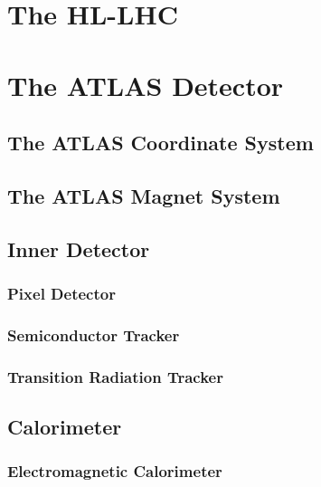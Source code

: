 \documentclass{umassthesis}          %
\begin{document}
\section{The HL-LHC}\label{sec:hl_lhc}


\section{The ATLAS Detector}\label{sec:atlas_detector}


\subsection{The ATLAS Coordinate System}\label{sec:atlas_coordinate_system}


\subsection{The ATLAS Magnet System}\label{sec:atlas_magnet}


\subsection{Inner Detector}\label{sec:atlas_id}

\subsubsection{Pixel Detector}\label{sec:atlas_pixel}

\subsubsection{Semiconductor Tracker}\label{sec:atlas_sct}

\subsubsection{Transition Radiation Tracker}\label{sec:atlas_trt}


\subsection{Calorimeter}\label{sec:atlas_calorimeter}

\subsubsection{Electromagnetic Calorimeter}\label{sec:atlas_em_calorimeter}

\end{document}
